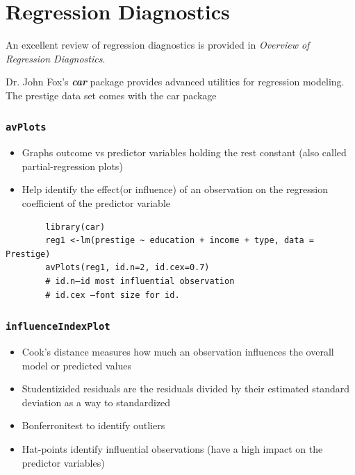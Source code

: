 \documentclass[main.tex]{subfiles}
\begin{document}
	
	\section{Regression Diagnostics}
	
	An excellent review of regression diagnostics is provided in  \textit{Overview of Regression Diagnostics}. 
	
	Dr. John Fox's \textbf{\textit{car}} package provides advanced utilities for regression modeling. The prestige data set comes with the car package
	
	\subsubsection*{\texttt{avPlots}}
	\begin{itemize}
		\item Graphs outcome vs predictor variables holding the rest constant (also called partial-regression plots)
		\item  Help identify the effect(or influence) of an observation on the regression coefficient of the predictor variable
	\end{itemize}
	\begin{framed}
		\begin{verbatim}
		library(car)
		reg1 <-lm(prestige ~ education + income + type, data = Prestige)
		avPlots(reg1, id.n=2, id.cex=0.7)
		# id.n–id most influential observation
		# id.cex –font size for id.
		\end{verbatim}
	\end{framed}
	\subsubsection*{\texttt{influenceIndexPlot}}
	\begin{itemize}
		\item Cook's distance measures how much an observation influences the overall model or predicted values
		\item  Studentizided residuals are the residuals divided by their estimated standard deviation as a way to standardized
		\item  Bonferronitest to identify outliers
		\item Hat-points identify influential observations (have a high impact on the predictor variables)
	\end{itemize}
	
\end{document}
